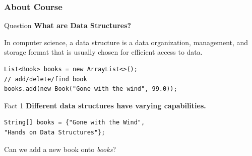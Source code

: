 \documentclass[aspectratio=169, 14pt]{beamer}
\begin{document}


\begin{frame}[fragile]
\frametitle{About Course}
\begin{exampleblock}{Question}
\textbf{What are \alert{Data Structures}?}
\end{exampleblock}
\pause
\begin{displayquote}
    In computer science, a data structure is a data organization, management, and storage format that is usually chosen for efficient access to data.
\end{displayquote}

\pause

\begin{verbatim}
List<Book> books = new ArrayList<>();
// add/delete/find book
books.add(new Book("Gone with the wind", 99.0));
\end{verbatim}

\end{frame}

\begin{frame}[fragile]
    \begin{block}{Fact 1}
        \textbf{Different data structures have varying \alert{capabilities}.}
    \end{block}
    \begin{verbatim}
String[] books = {"Gone with the Wind", 
"Hands on Data Structures"};
    \end{verbatim} 
    {\large {}} Can we add a new book onto \emph{books}?
\pause

\end{frame}
\end{document}
